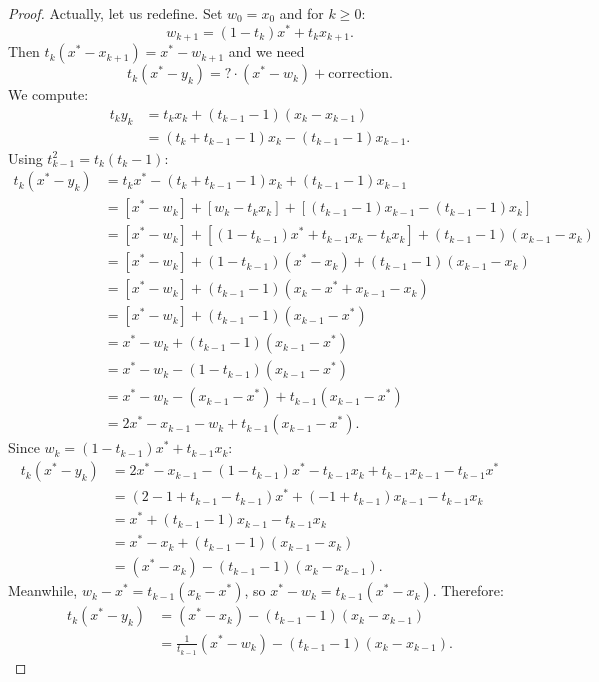 \documentclass[11pt,a4paper]{article}
\begin{document}
\begin{proof}
Actually, let us redefine. Set $w_0 = x_0$ and for $k \ge 0$:
\begin{equation}\label{eq:wk-update}
  w_{k+1} = (1 - t_k)x^* + t_k x_{k+1}.
\end{equation}
Then $t_k(x^* - x_{k+1}) = x^* - w_{k+1}$ and we need
\begin{equation}\label{eq:need}
  t_k(x^* - y_k) = \text{?} \cdot (x^* - w_k) + \text{correction}.
\end{equation}
We compute:
\begin{align*}
  t_k y_k &= t_k x_k + (t_{k-1} - 1)(x_k - x_{k-1}) \\
  &= (t_k + t_{k-1} - 1)x_k - (t_{k-1} - 1)x_{k-1}.
\end{align*}
Using $t_{k-1}^2 = t_k(t_k - 1)$:
\begin{align*}
  t_k(x^* - y_k)
  &= t_k x^* - (t_k + t_{k-1} - 1)x_k + (t_{k-1} - 1)x_{k-1} \\
  &= [x^* - w_k] + [w_k - t_k x_k] + [(t_{k-1}-1)x_{k-1}
    - (t_{k-1}-1)x_k] \\
  &= [x^* - w_k] + [(1-t_{k-1})x^* + t_{k-1}x_k - t_k x_k]
    + (t_{k-1}-1)(x_{k-1} - x_k) \\
  &= [x^* - w_k] + (1-t_{k-1})(x^* - x_k)
    + (t_{k-1}-1)(x_{k-1} - x_k) \\
  &= [x^* - w_k] + (t_{k-1}-1)(x_k - x^* + x_{k-1} - x_k) \\
  &= [x^* - w_k] + (t_{k-1}-1)(x_{k-1} - x^*) \\
  &= x^* - w_k + (t_{k-1}-1)(x_{k-1} - x^*) \\
  &= x^* - w_k - (1 - t_{k-1})(x_{k-1} - x^*) \\
  &= x^* - w_k - (x_{k-1} - x^*) + t_{k-1}(x_{k-1} - x^*) \\
  &= 2x^* - x_{k-1} - w_k + t_{k-1}(x_{k-1} - x^*).
\end{align*}
Since $w_k = (1-t_{k-1})x^* + t_{k-1}x_k$:
\begin{align*}
  t_k(x^* - y_k)
  &= 2x^* - x_{k-1} - (1-t_{k-1})x^* - t_{k-1}x_k
    + t_{k-1}x_{k-1} - t_{k-1}x^* \\
  &= (2 - 1 + t_{k-1} - t_{k-1})x^* + (-1 + t_{k-1})x_{k-1}
    - t_{k-1}x_k \\
  &= x^* + (t_{k-1} - 1)x_{k-1} - t_{k-1}x_k \\
  &= x^* - x_k + (t_{k-1}-1)(x_{k-1} - x_k) \\
  &= (x^* - x_k) - (t_{k-1}-1)(x_k - x_{k-1}).
\end{align*}
Meanwhile, $w_k - x^* = t_{k-1}(x_k - x^*)$, so
$x^* - w_k = t_{k-1}(x^* - x_k)$. Therefore:
\begin{align*}
  t_k(x^* - y_k)
  &= (x^* - x_k) - (t_{k-1}-1)(x_k - x_{k-1}) \\
  &= \frac{1}{t_{k-1}}(x^* - w_k) - (t_{k-1}-1)(x_k - x_{k-1}).
\end{align*}


\end{proof}
\end{document}
